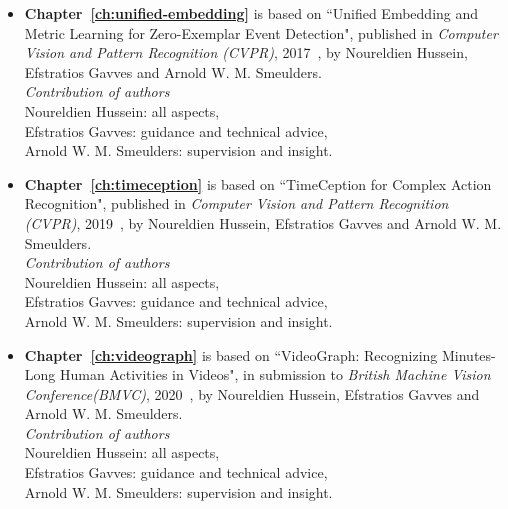 

\begin{itemize}
\item
\textbf{Chapter~\ref{ch:unified-embedding}} is based on ``Unified Embedding and Metric Learning for Zero-Exemplar Event Detection", published in \textit{Computer Vision and Pattern Recognition (CVPR)}, 2017~\cite{hussein2017unified}, by Noureldien Hussein, Efstratios Gavves and Arnold W. M. Smeulders.
\vspace*{5pt}
\\
\textit{Contribution of authors}
\vspace*{5pt}
\\
Noureldien Hussein: all aspects,\\
Efstratios Gavves: guidance and technical advice,\\
Arnold W. M. Smeulders: supervision and insight.

\item
\textbf{Chapter~\ref{ch:timeception}} is based on ``TimeCeption for Complex Action Recognition", published in \textit{Computer Vision and Pattern Recognition (CVPR)}, 2019~\cite{hussein2017unified}, by Noureldien Hussein, Efstratios Gavves and Arnold W. M. Smeulders.
\vspace*{5pt}
\\
\textit{Contribution of authors}
\vspace*{5pt}
\\
Noureldien Hussein: all aspects,\\
Efstratios Gavves: guidance and technical advice,\\
Arnold W. M. Smeulders: supervision and insight.

\item
\textbf{Chapter~\ref{ch:videograph}} is based on ``VideoGraph: Recognizing Minutes-Long Human Activities in Videos", in submission to \textit{British Machine Vision Conference(BMVC)}, 2020~\cite{hussein2019videograph}, by Noureldien Hussein, Efstratios Gavves and Arnold W. M. Smeulders.
\vspace*{5pt}
\\
\textit{Contribution of authors}
\vspace*{5pt}
\\
Noureldien Hussein: all aspects,\\
Efstratios Gavves: guidance and technical advice,\\
Arnold W. M. Smeulders: supervision and insight.


\end{itemize}
